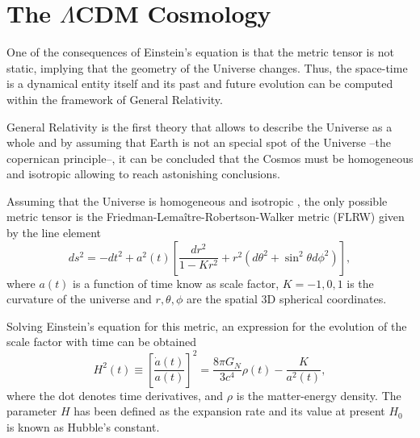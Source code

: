 \section{The $\Lambda$CDM Cosmology}
One of the consequences of Einstein's equation is that the metric tensor is not static, implying that the geometry of the Universe changes. Thus, the space-time is a dynamical entity itself and its past and future evolution can be computed within the framework of General Relativity.
\newline

General Relativity is the first theory that allows to describe the Universe as a whole and by assuming that Earth is not an special spot of the Universe --the copernican principle--, it can be concluded that the Cosmos must be homogeneous and isotropic allowing to reach astonishing conclusions.
\newline

Assuming that the Universe is homogeneous and isotropic \citep{2014MNRAS.440...10A,2015MNRAS.449..670A}, the only possible metric tensor is the Friedman-Lema\^itre-Robertson-Walker metric (FLRW) given by the line element \cite{1927ASSB...47...49L}
\begin{equation}
ds^2 = -dt^2+a^2(t)\left[\frac{dr^2}{1-Kr^2}+r^2(d\theta^2+\sin^2\theta d\phi^2)\right],
\end{equation}
where $a(t)$ is a function of time know as scale factor, $K=-1,0,1$ is the curvature of the universe and $r,\theta,\phi$ are the spatial 3D spherical coordinates.
\newline

Solving Einstein's equation for this metric, an expression for the evolution of the scale factor with time can be obtained
\begin{equation}
H^2(t)\equiv \left[\frac{\dot a(t)}{a(t)}\right]^2 = \frac{8\pi G_N}{3c^4}\rho(t) -\frac{K}{a^2(t)},
\end{equation}
where the dot denotes time derivatives, and $\rho$ is the matter-energy density. The parameter $H$ has been defined as the expansion rate and its value at present $H_0$ is known as Hubble's constant.
\newline

